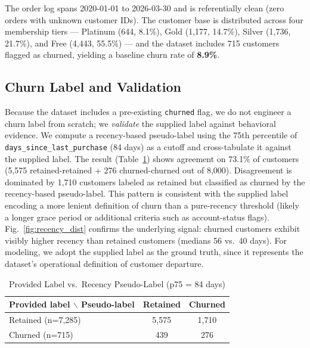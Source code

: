 \documentclass[conference]{IEEEtran}
\begin{document}
The order log spans 2020-01-01 to 2026-03-30 and is referentially clean (zero orders with unknown customer IDs). The customer base is distributed across four membership tiers — Platinum (644, 8.1\%), Gold (1{,}177, 14.7\%), Silver (1{,}736, 21.7\%), and Free (4{,}443, 55.5\%) — and the dataset includes 715 customers flagged as churned, yielding a baseline churn rate of \textbf{8.9\%}.

\subsection{Churn Label and Validation}

Because the dataset includes a pre-existing \texttt{churned} flag, we do not engineer a churn label from scratch; we \emph{validate} the supplied label against behavioral evidence. We compute a recency-based pseudo-label using the 75th percentile of \texttt{days\_since\_last\_purchase} (84 days) as a cutoff and cross-tabulate it against the supplied label. The result (Table~\ref{tab:label_validation}) shows agreement on 73.1\% of customers (5{,}575 retained-retained + 276 churned-churned out of 8{,}000). Disagreement is dominated by 1{,}710 customers labeled as retained but classified as churned by the recency-based pseudo-label. This pattern is consistent with the supplied label encoding a more lenient definition of churn than a pure-recency threshold (likely a longer grace period or additional criteria such as account-status flags). Fig.~\ref{fig:recency_dist} confirms the underlying signal: churned customers exhibit visibly higher recency than retained customers (medians 56 vs.\ 40 days). For modeling, we adopt the supplied label as the ground truth, since it represents the dataset's operational definition of customer departure.

\begin{table}[h]
\caption{Provided Label vs.\ Recency Pseudo-Label (p75 = 84 days)}
\label{tab:label_validation}
\centering
\renewcommand{\arraystretch}{1.2}
\begin{tabular}{l c c}
\toprule
\textbf{Provided label} $\backslash$ \textbf{Pseudo-label} & \textbf{Retained} & \textbf{Churned} \\
\midrule
Retained (n=7{,}285) & 5{,}575 & 1{,}710 \\
Churned (n=715)      &   439   &   276  \\
\bottomrule
\end{tabular}
\end{table}
\end{document}

